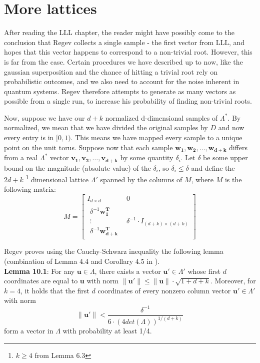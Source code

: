 \chapter{More lattices}

After reading the LLL chapter, the reader might have possibly come to the conclusion that Regev collects a single sample - the first vector from LLL, and hopes that this vector happens to correspond to a non-trivial root. However, this is far from the case. Certain procedures we have described up to now, like the gaussian superposition and the chance of hitting a trivial root rely on probabilistic outcomes, and we also need to account for the noise inherent in quantum systems. Regev therefore attempts to generate as many vectors as possible from a single run, to increase his probability of finding non-trivial roots.

Now, suppose we have our $d+k$ normalized d-dimensional samples of $\mathit \Lambda^*$. By normalized, we mean that we have divided the original samples by $D$ and now every entry is in $[0,1)$. This means we have mapped every sample to a unique point on the unit torus. Suppose now that each sample $\mathbf{w_1,w_2,\dots,w_{d+k}}$ differs from a real $\Lambda^*$ vector $\mathbf{v_1,v_2,\dots,v_{d+k}}$ by some quantity $\delta_i$. Let $\delta$ be some upper bound on the magnitude (absolute value) of the $\delta_i$, so $\delta_i \leq \delta$ and define the $2d+k$ \footnote{$k \geq 4$ from Lemma 6.3} dimensional lattice $\mathit \Lambda'$ spanned by the columns of $M$, where $M$ is the following matrix: 
\begin{equation}
M = \left[
\begin{array}{c|c}
  I_{d\times d} & 0 \\
  \hline
  \begin{matrix} \delta^{-1}\mathbf{w_1^T} \\  \vdots \\ \delta^{-1}\mathbf{w_{d+k}^T} \end{matrix} & \delta^{-1} \cdot I_{(d+k)\times (d+k)}
\end{array}
\right]    
\label{eq10.1}
\end{equation}



Regev proves using the Cauchy-Schwarz inequality the following lemma (combination of Lemma 4.4 and Corollary 4.5 in \cite{Regev2025}). \\

\textbf{Lemma 10.1}: For any $\mathbf{u} \in \Lambda$, there exists a vector $\mathbf{u}' \in \Lambda'$ whose first $d$ coordinates are equal to \textbf{u} with norm $\lVert \mathbf{u'} \rVert \leq \lVert \mathbf{u} \rVert \cdot \sqrt{1+d+k}$. Moreover, for $k = 4$, it holds that the first $d$ coordinates of every nonzero column vector $\mathbf{u'} \in \Lambda'$ with norm 
\begin{equation}
\lVert \mathbf{u'} \rVert < \frac{\delta^{-1}}{6 \cdot (4det(\Lambda))^{1/(d+k)}}  
\label{eq10.2}
\end{equation}
form a vector in $\Lambda$ with probability at least 1/4.

